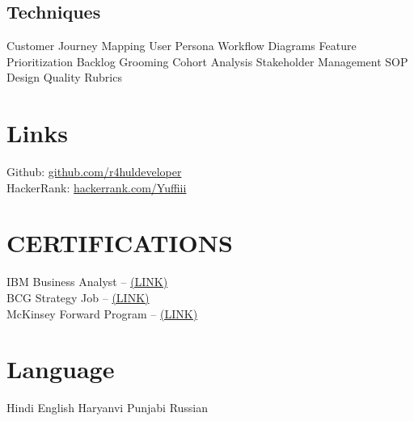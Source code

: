\documentclass[letterpaper]{deedy-resume} %
\begin{document}
\begin{minipage}[t]{0.30\textwidth}
\subsection{Techniques}
\textbullet{} Customer Journey Mapping \textbullet{} User Persona \textbullet{} Workflow Diagrams \textbullet{} Feature Prioritization \textbullet{} Backlog Grooming \textbullet{} Cohort Analysis \textbullet{} Stakeholder Management \textbullet{} SOP Design \textbullet{} Quality Rubrics
\sectionspace %


\section{Links} 

Github: \href{https://github.com/r4huldeveloper}{github.com/r4huldeveloper} \\
HackerRank: \href{https://hackerrank.com/profile/Yuffiii} {hackerrank.com/Yuffiii} \\
\sectionspace %


\section{CERTIFICATIONS} 
IBM Business Analyst -- \href{https://www.credly.com/users/rahul-sharma.d826a05f}{{\color{blue}(LINK)}} \\
BCG Strategy Job -- \href{https://www.theforage.com/completion-certificates/SKZxezskWgmFjRvj9/ntTvo6ru6Tq3A2JPq_SKZxezskWgmFjRvj9_68d963167ede33c101b08dce_1759577296721_completion_certificate.pdf}{{\color{blue}(LINK)}} \\
McKinsey Forward Program -- \href{https://www.credly.com/badges/6929d672-8aca-42ef-b89f-9915b946493a/public_url}{{\color{blue}(LINK)}} \\
\sectionspace 

\section{Language} 
\textbullet{}Hindi \textbullet{}English \textbullet{}Haryanvi \textbullet{}Punjabi \textbullet{}Russian


\end{minipage} %
\end{document}
